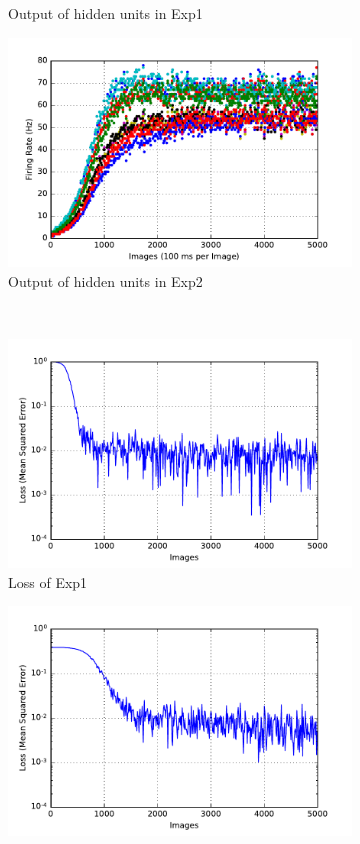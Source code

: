 \begin{figure}
\begin{subfigure}[t]{0.4\textwidth}
		\caption{Output of hidden units in Exp1}
	\end{subfigure}
	\begin{subfigure}[t]{0.4\textwidth}
		\includegraphics[width=\textwidth]{pics_sdlm/00_exp_SAE_Orig/exp2_hid_s.pdf}
		\caption{Output of hidden units in Exp2}
	\end{subfigure}\\
	\begin{subfigure}[t]{0.4\textwidth}
		\includegraphics[width=\textwidth]{pics_sdlm/00_exp_SAE_Orig/exp1_mse_nons.pdf}
		\caption{Loss of Exp1}
	\end{subfigure}
	\begin{subfigure}[t]{0.4\textwidth}
		\includegraphics[width=\textwidth]{pics_sdlm/00_exp_SAE_Orig/exp2_mse_nons.pdf}

\end{subfigure}
\end{figure}
